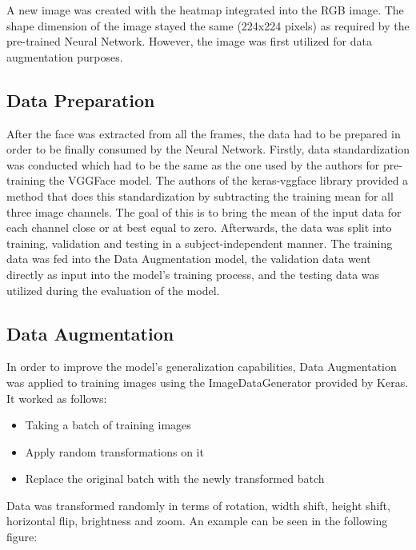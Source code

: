 A new image was created with the heatmap integrated into the RGB image. The shape dimension of the image stayed the same (224x224 pixels) as required by the pre-trained Neural Network. However, the image was first utilized for data augmentation purposes.

\subsection{Data Preparation}
After the face was extracted from all the frames, the data had to be prepared in order to be finally consumed by the Neural Network. Firstly, data standardization was conducted which had to be the same as the one used by the authors for pre-training the VGGFace model. The authors of the keras-vggface library provided a method that does this standardization by subtracting the training mean for all three image channels. The goal of this is to bring the mean of the input data for each channel close or at best equal to zero.
\newline\newline
Afterwards, the data was split into training, validation and testing in a subject-independent manner. The training data was fed into the Data Augmentation model, the validation data went directly as input into the model's training process, and the testing data was utilized during the evaluation of the model.

\subsection{Data Augmentation}
In order to improve the model's generalization capabilities, Data Augmentation was applied to training images using the ImageDataGenerator provided by Keras. It worked as follows:
\begin{itemize}
    \item Taking a batch of training images
    \item Apply random transformations on it
    \item Replace the original batch with the newly transformed batch
\end{itemize}
Data was transformed randomly in terms of rotation, width shift, height shift, horizontal flip, brightness and zoom. An example can be seen in the following figure:

